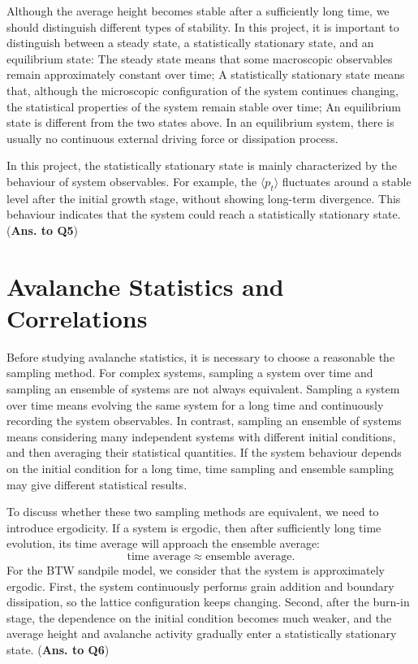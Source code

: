 Although the average height becomes stable after a sufficiently long time, we should distinguish different types of stability. In this project, it is important to distinguish between a steady state, a statistically stationary state, and an equilibrium state: The steady state means that some macroscopic observables remain approximately constant over time; A statistically stationary state means that, although the microscopic configuration of the system continues changing, the statistical properties of the system remain stable over time; An equilibrium state is different from the two states above. In an equilibrium system, there is usually no continuous external driving force or dissipation process. 

In this project, the statistically stationary state is mainly characterized by the behaviour of system observables. For example, the $\langle p_t \rangle$ fluctuates around a stable level after the initial growth stage, without showing long-term divergence. This behaviour indicates that the system could reach a statistically stationary state. (\textbf{Ans. to Q5})



\section{Avalanche Statistics and Correlations}

Before studying avalanche statistics, it is necessary to choose a reasonable the sampling method. For complex systems, sampling a system over time and sampling an ensemble of systems are not always equivalent. Sampling a system over time means evolving the same system for a long time and continuously recording the system observables. In contrast, sampling an ensemble of systems means considering many independent systems with different initial conditions, and then averaging their statistical quantities. If the system behaviour depends on the initial condition for a long time, time sampling and ensemble sampling may give different statistical results.

To discuss whether these two sampling methods are equivalent, we need to introduce ergodicity. If a system is ergodic, then after sufficiently long time evolution, its time average will approach the ensemble average:
$$
\text{time average} \approx \text{ensemble average}.
$$
For the BTW sandpile model, we consider that the system is approximately ergodic. First, the system continuously performs grain addition and boundary dissipation, so the lattice configuration keeps changing. Second, after the burn-in stage, the dependence on the initial condition becomes much weaker, and the average height and avalanche activity gradually enter a statistically stationary state. (\textbf{Ans. to Q6})

